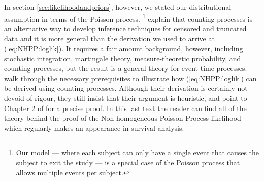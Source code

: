 \documentclass[12pt]{article}
\begin{document}
In section \ref{sec:likelihoodandpriors}, however, we stated our distributional assumption in terms of the Poisson process.%
\footnote{Our model --- where each subject can only have a single event that causes the subject to exit the study --- is a special case of the Poisson process that allows multiple events per subject.}
\citet{klein2003survival} explain that counting processes is an alternative way to develop inference techniques for censored and truncated data and it is more general than the derivation we used to arrive at (\ref{eq:NHPP:loglik}).
It requires a fair amount background, however, including stochastic integration, martingale theory, measure-theoretic probability, and counting processes, but the result is a general theory for event-time processes.
\citet[ch.~3.6]{klein2003survival} walk through the necessary prerequisites to illustrate how (\ref{eq:NHPP:loglik}) can be derived using counting processes.
Although their derivation is certainly not devoid of rigour, they still insist that their argument is heuristic, and point to Chapter 2 of \citet{Andersonetal1993} for a precise proof. 
In this last text the reader can find all of the theory behind the proof of the Non-homogeneous Poisson Process likelihood --- which regularly makes an appearance in survival analysis.



\end{document}
